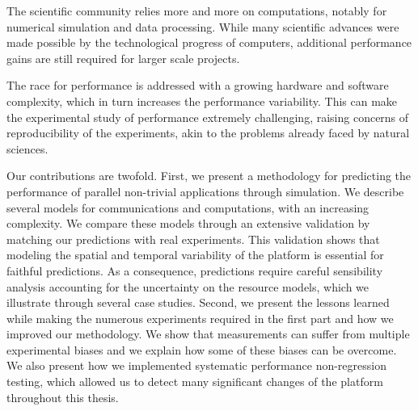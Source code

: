 The scientific community relies more and more on computations, notably for numerical simulation and data processing.
While many scientific advances were made possible by the technological progress of computers, additional performance
gains are still required for larger scale projects.

The race for performance is addressed with a growing hardware and software complexity, which in turn increases the
performance variability. This can make the experimental study of performance extremely challenging, raising concerns of
reproducibility of the experiments, akin to the problems already faced by natural sciences.

Our contributions are twofold. First, we present a methodology for predicting the performance of parallel non-trivial
applications through simulation. We describe several models for communications and computations, with an increasing
complexity. We compare these models through an extensive validation by matching our predictions with real experiments.
This validation shows that modeling the spatial and temporal variability of the platform is essential for faithful
predictions. As a consequence, predictions require careful sensibility analysis accounting for the uncertainty on the
resource models, which we illustrate through several case studies.  Second, we present the lessons learned while making
the numerous experiments required in the first part and how we improved our methodology. We show that measurements can
suffer from multiple experimental biases and we explain how some of these biases can be overcome. We also present how we
implemented systematic performance non-regression testing, which allowed us to detect many significant changes of the
platform throughout this thesis.
